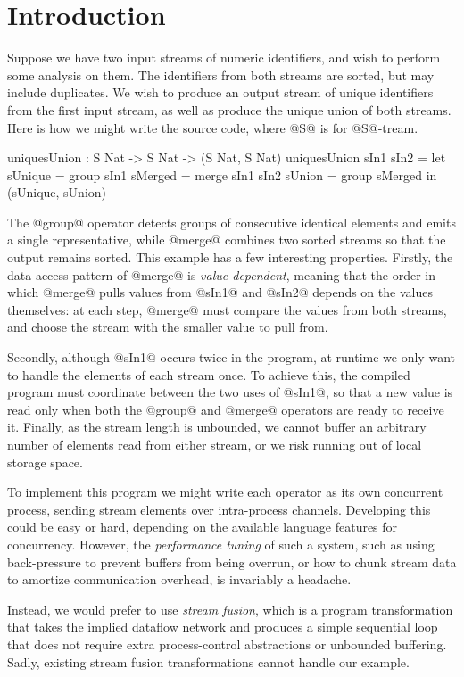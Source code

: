\section{Introduction}
\label{s:Introduction}

Suppose we have two input streams of numeric identifiers, and wish to perform some analysis on them. The identifiers from both streams are sorted, but may include duplicates. We wish to produce an output stream of unique identifiers from the first input stream, as well as produce the unique union of both streams. Here is how we might write the source code, where @S@ is for @S@-tream.
\begin{code}
  uniquesUnion : S Nat -> S Nat -> (S Nat, S Nat)
  uniquesUnion sIn1 sIn2
   = let  sUnique = group sIn1
          sMerged = merge sIn1 sIn2
          sUnion  = group sMerged
     in   (sUnique, sUnion)
\end{code}

The @group@ operator detects groups of consecutive identical elements and emits a single representative, while @merge@ combines two sorted streams so that the output remains sorted. This example has a few interesting properties. Firstly, the data-access pattern of @merge@ is \emph{value-dependent}, meaning that the order in which @merge@ pulls values from @sIn1@ and @sIn2@ depends on the values themselves: at each step, @merge@ must compare the values from both streams, and choose the stream with the smaller value to pull from.

Secondly, although @sIn1@ occurs twice in the program, at runtime we only want to handle the elements of each stream once. To achieve this, the compiled program must coordinate between the two uses of @sIn1@, so that a new value is read only when both the @group@ and @merge@ operators are ready to receive it. Finally, as the stream length is unbounded, we cannot buffer an arbitrary number of elements read from either stream, or we risk running out of local storage space.

To implement this program we might write each operator as its own concurrent process, sending stream elements over intra-process channels. Developing this could be easy or hard, depending on the available language features for concurrency. However, the \emph{performance tuning} of such a system, such as using back-pressure to prevent buffers from being overrun, or how to chunk stream data to amortize communication overhead, is invariably a headache. 

Instead, we would prefer to use \emph{stream fusion}, which is a program transformation that takes the implied dataflow network and produces a simple sequential loop that does not require extra process-control abstractions or unbounded buffering. Sadly, existing stream fusion transformations cannot handle our example. 

